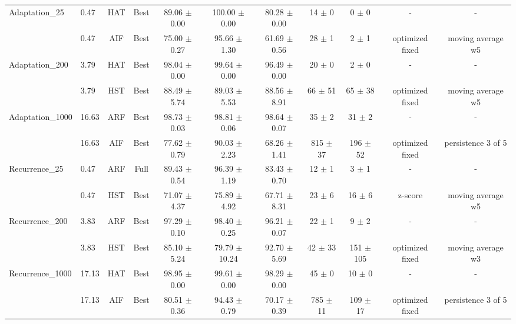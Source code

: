 \begin{table}[ht]
{\begin{tabular}{llccccccccc}
\hline
Adaptation\_25 & 0.47 & HAT & Best & 89.06 $\pm$ 0.00 & 100.00 $\pm$ 0.00 & 80.28 $\pm$ 0.00 & 14 $\pm$ 0 & 0 $\pm$ 0 & - & - \\
 & 0.47 & AIF & Best & 75.00 $\pm$ 0.27 & 95.66 $\pm$ 1.30 & 61.69 $\pm$ 0.56 & 28 $\pm$ 1 & 2 $\pm$ 1 & optimized fixed & moving average w5 \\
\hline
Adaptation\_200 & 3.79 & HAT & Best & 98.04 $\pm$ 0.00 & 99.64 $\pm$ 0.00 & 96.49 $\pm$ 0.00 & 20 $\pm$ 0 & 2 $\pm$ 0 & - & - \\
 & 3.79 & HST & Best & 88.49 $\pm$ 5.74 & 89.03 $\pm$ 5.53 & 88.56 $\pm$ 8.91 & 66 $\pm$ 51 & 65 $\pm$ 38 & optimized fixed & moving average w5 \\
\hline
Adaptation\_1000 & 16.63 & ARF & Best & 98.73 $\pm$ 0.03 & 98.81 $\pm$ 0.06 & 98.64 $\pm$ 0.07 & 35 $\pm$ 2 & 31 $\pm$ 2 & - & - \\
 & 16.63 & AIF & Best & 77.62 $\pm$ 0.79 & 90.03 $\pm$ 2.23 & 68.26 $\pm$ 1.41 & 815 $\pm$ 37 & 196 $\pm$ 52 & optimized fixed & persistence 3 of 5 \\
\hline
Recurrence\_25 & 0.47 & ARF & Full & 89.43 $\pm$ 0.54 & 96.39 $\pm$ 1.19 & 83.43 $\pm$ 0.70 & 12 $\pm$ 1 & 3 $\pm$ 1 & - & - \\
 & 0.47 & HST & Best & 71.07 $\pm$ 4.37 & 75.89 $\pm$ 4.92 & 67.71 $\pm$ 8.31 & 23 $\pm$ 6 & 16 $\pm$ 6 & z-score & moving average w5 \\
\hline
Recurrence\_200 & 3.83 & ARF & Best & 97.29 $\pm$ 0.10 & 98.40 $\pm$ 0.25 & 96.21 $\pm$ 0.07 & 22 $\pm$ 1 & 9 $\pm$ 2 & - & - \\
 & 3.83 & HST & Best & 85.10 $\pm$ 5.24 & 79.79 $\pm$ 10.24 & 92.70 $\pm$ 5.69 & 42 $\pm$ 33 & 151 $\pm$ 105 & optimized fixed & moving average w3 \\
\hline
Recurrence\_1000 & 17.13 & HAT & Best & 98.95 $\pm$ 0.00 & 99.61 $\pm$ 0.00 & 98.29 $\pm$ 0.00 & 45 $\pm$ 0 & 10 $\pm$ 0 & - & - \\
 & 17.13 & AIF & Best & 80.51 $\pm$ 0.36 & 94.43 $\pm$ 0.79 & 70.17 $\pm$ 0.39 & 785 $\pm$ 11 & 109 $\pm$ 17 & optimized fixed & persistence 3 of 5 \\
\hline
\end{tabular}%
}
\end{table}